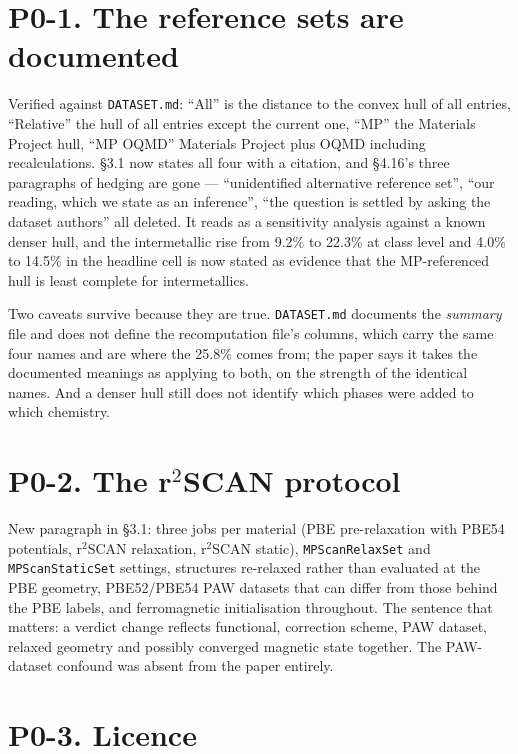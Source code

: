 \documentclass[11pt]{article}
\begin{document}
\section*{P0-1. The reference sets are documented}

Verified against \texttt{DATASET.md}: ``All'' is the distance to the convex hull of all
entries, ``Relative'' the hull of all entries except the current one, ``MP'' the Materials
Project hull, ``MP OQMD'' Materials Project plus OQMD including recalculations. \S3.1 now
states all four with a citation, and \S4.16's three paragraphs of hedging are gone ---
``unidentified alternative reference set'', ``our reading, which we state as an inference'',
``the question is settled by asking the dataset authors'' all deleted. It reads as a
sensitivity analysis against a known denser hull, and the intermetallic rise from 9.2\% to
22.3\% at class level and 4.0\% to 14.5\% in the headline cell is now stated as evidence
that the MP-referenced hull is least complete for intermetallics.

Two caveats survive because they are true. \texttt{DATASET.md} documents the
\emph{summary} file and does not define the recomputation file's columns, which carry the
same four names and are where the 25.8\% comes from; the paper says it takes the documented
meanings as applying to both, on the strength of the identical names. And a denser hull
still does not identify which phases were added to which chemistry.

\section*{P0-2. The r$^2$SCAN protocol}

New paragraph in \S3.1: three jobs per material (PBE pre-relaxation with PBE54 potentials,
r$^2$SCAN relaxation, r$^2$SCAN static), \texttt{MPScanRelaxSet} and
\texttt{MPScanStaticSet} settings, structures re-relaxed rather than evaluated at the PBE
geometry, PBE52/PBE54 PAW datasets that can differ from those behind the PBE labels, and
ferromagnetic initialisation throughout. The sentence that matters: a verdict change
reflects functional, correction scheme, PAW dataset, relaxed geometry and possibly
converged magnetic state together. The PAW-dataset confound was absent from the paper
entirely.

\section*{P0-3. Licence}
\end{document}
